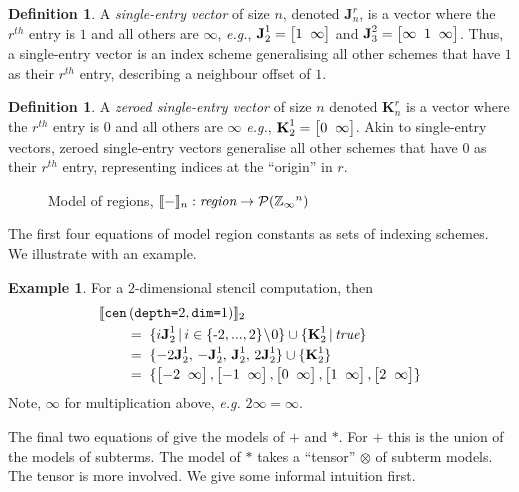 \documentclass[10pt,preprint,numbers]{sigplanconf}
\newcounter{block}
\theoremstyle{definition}
\newtheorem{example}[block]{Example}
\newtheorem{definition}[block]{Definition}
\newcommand{\eg}{\emph{e.g.}}
\newcommand{\interp}[1]{\llbracket{#1}\rrbracket}
\newcommand{\term}[1]{\texttt{#1}}
\newcommand{\stenCenS}[2]{\term{cen} \, (\term{depth=}#1,
  \term{dim=}#2)}
\newcommand{\vtwoh}[2]{\setlength{\arraycolsep}{0em}
\left[\begin{array}{cc}#1 \; & \; #2\end{array}\right]}
\newcommand{\vthreeh}[3]{\setlength{\arraycolsep}{0em}
\left[\begin{array}{ccc}#1 \; & \; #2 \; & \; #3\end{array}\right]}
\newcommand{\singleEntry}[2]{\textbf{J}_{#2}^{#1}}
\newcommand{\zeroEntry}[2]{\textbf{K}_{#2}^{#1}}
\begin{document}
\begin{definition}A \emph{single-entry vector} of size $n$, denoted
$\singleEntry{r}{n}$, is a vector where the $r^{th}$ entry is $1$
and all others are $\infty$, \eg{}, $\singleEntry{1}{2} =
\vtwoh{1}{\infty}$ and $\singleEntry{2}{3} = \vthreeh{\infty}{1}{\infty}$.
Thus, a single-entry vector is an index scheme generalising 
all other schemes that have $1$ as their $r^{th}$ entry,
describing a neighbour offset of $1$.
\end{definition}

\begin{definition}
A \emph{zeroed single-entry vector} of size $n$ denoted
$\zeroEntry{r}{n}$ is a vector where the $r^{th}$ entry is $0$ and all others
are $\infty$ \eg{}, $\zeroEntry{1}{2} = \vtwoh{0}{\infty}$.
Akin to single-entry vectors, zeroed single-entry vectors
generalise all other schemes
that have $0$ as their $r^{th}$ entry, representing indices at
the ``origin'' in $r$.
\end{definition}

\begin{figure}[t]
\vspace{-0.9em}

\caption{Model of regions,
$\interp{-}_n : \textit{region} \rightarrow \mathcal{P}(\domainVal{}^n)$}
\label{fig:region-model}
\vspace{-1em}
\end{figure}

\noindent
The first four equations of 
model region constants as sets of indexing
schemes. We illustrate with an example.

\begin{example}
For a $2$-dimensional stencil computation, then
\begin{align*}
& \interp{\stenCenS{2}{1}}_2 \\[-0.1em]
& \qquad = \; \{i\singleEntry{1}{2} \,|\, i \in \{\text{-}2,..., 2\}\!\setminus\!0 \}
  \cup  \{ \zeroEntry{1}{2} \,|\, \textit{true} \} \\[-0.2em]
& \qquad = \; \{-2\singleEntry{1}{2}, \, -\singleEntry{1}{2}, \,
  \singleEntry{1}{2}, \, 2\singleEntry{1}{2}\} \cup
  \{\zeroEntry{1}{2}\} \\[-0.2em]
& \qquad = \; \{\vtwoh{-2}{\infty}, \vtwoh{-1}{\infty}, \vtwoh{0}{\infty},
\vtwoh{1}{\infty}, \vtwoh{2}{\infty}\}
\end{align*}
Note, $\infty$ for multiplication above, \eg{} $2
 \infty = \infty$.
\end{example}
\noindent
The final two equations of  give the models
of $\term{+}$ and $\term{*}$. For $\term{+}$ this is the
 union of the models of subterms. The model of
$\term{*}$ takes a ``tensor'' $\otimes$ of subterm models. The tensor is
more involved. We give some informal intuition first.
\end{document}
